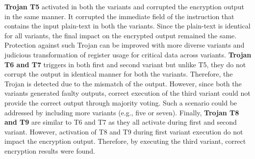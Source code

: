 \documentclass[conference]{IEEEtran}
\begin{document}
\textbf{Trojan T5} activated in both the variants and corrupted the encryption output in the same manner. It corrupted the immediate field of the instruction that contains the input plain-text in both the variants. Since the plain-text is identical for all variants, the final impact on the encrypted output remained the same.   Protection against such Trojan can be improved with more diverse variants and judicious transformation of register usage for critical data across variants. \textbf{Trojan T6 and T7} triggers in both first and second variant but unlike T5, they do not corrupt the output in identical manner for both the variants. Therefore, the Trojan is detected due to the mismatch of the output. However, since both the variants generated faulty outputs, correct execution of the third variant could not provide the correct output through majority voting. Such a scenario could be addressed by including more variants (e.g., five or seven). Finally, \textbf{Trojan T8 and T9} are similar to T6 and T7 as they all activate during first and second variant. However, activation of T8 and T9 during first variant execution do not impact the encryption output. Therefore, by executing the third variant, correct encryption results were found. 
\end{document}
